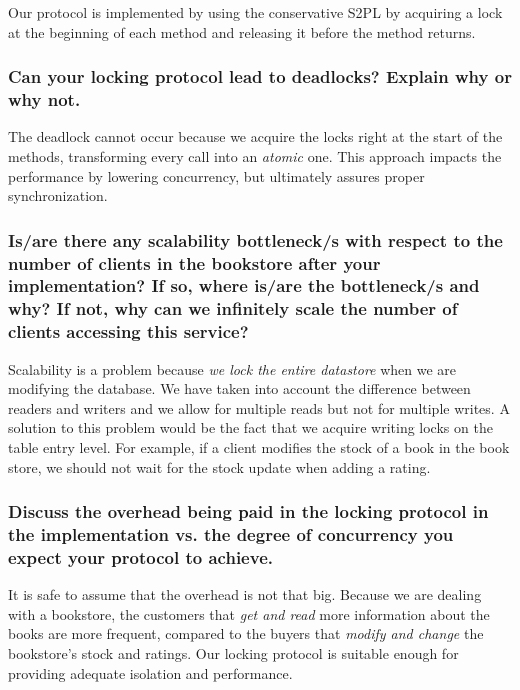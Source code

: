 \documentclass{article}      %
\begin{document}
Our protocol is implemented by using the conservative S2PL by acquiring a lock at the beginning of each method and releasing it before the method returns.\\

\subsubsection*{Can your locking protocol lead to deadlocks? Explain why or why not.}

The deadlock cannot occur because we acquire the locks right at the start of the methods, transforming every call into an \emph{atomic} one. This approach impacts the performance by lowering concurrency, but ultimately assures proper synchronization.\\

\subsubsection*{Is/are there any scalability bottleneck/s with respect to the number of clients in the bookstore after your implementation? If so, where is/are the bottleneck/s and why? If not, why can we infinitely scale the number of clients accessing this service?}

Scalability is a problem because \emph{we lock the entire datastore} when we are modifying the database. We have taken into account the difference between readers and writers and we allow for multiple reads but not for multiple writes. A solution to this problem would be the fact that we acquire writing locks on the table entry level. For example, if a client modifies the stock of a book in the book store, we should not wait for the stock update when adding a rating.\\

\subsubsection*{Discuss the overhead being paid in the locking protocol in the implementation vs. the degree of concurrency you expect your protocol to achieve.}

It is safe to assume that the overhead is not that big. Because we are dealing with a bookstore, the customers that \emph{get and read}  more information about the books are more frequent, compared to the buyers that \emph{modify and change} the bookstore's stock and ratings. Our locking protocol is suitable enough for providing adequate isolation and performance.

\newpage
\end{document}
